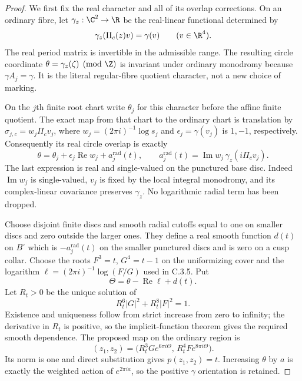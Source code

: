 \begin{proof}
We first fix the real character and all of its overlap corrections.
On an ordinary fibre, let
$\gamma_z:\C^2\to\R$ be the real-linear functional determined by
\[
 \gamma_z(\Pi_c(z)v)=\gamma(v)\qquad(v\in\R^4).
\]
The real period matrix is invertible in the admissible range.
The resulting circle coordinate
$\theta=\gamma_z(\zeta)\pmod\Z$ is invariant under ordinary
monodromy because $\gamma A_j=\gamma$. It is the literal
regular-fibre quotient character, not a new choice of marking.

On the $j$th finite root chart write $\theta_j$ for this
character before the affine finite quotient. The exact map from
that chart to the ordinary chart is translation by
$\sigma_{j,c}=w_j\Pi_cv_j$, where
$w_j=(2\pi i)^{-1}\log s_j$ and
$\epsilon_j=\gamma(v_j)$ is $1,-1$, respectively.
Consequently its real circle overlap is exactly
\begin{equation}\label{eq:C13-real-overlap}
 \theta=\theta_j+\epsilon_j\operatorname{Re}w_j+a_j^{\mathrm{rad}}(t),
 \qquad
 a_j^{\mathrm{rad}}(t)=\operatorname{Im}w_j\,
                  \gamma_z(i\Pi_cv_j).
\end{equation}
The last expression is real and single-valued on the punctured
base disc. Indeed $\operatorname{Im}w_j$ is single-valued,
$v_j$ is fixed by the local integral monodromy, and its
complex-linear covariance preserves $\gamma_z$.
No logarithmic radial term has been dropped.

Choose disjoint finite discs and smooth radial cutoffs equal to
one on smaller discs and zero outside the larger ones. They define
a real smooth function $d(t)$ on $B^\circ$ which is $-a_j^{\mathrm{rad}}(t)$
on the smaller punctured discs and is zero on a cusp collar.
Choose the roots $F^3=t$, $G^4=t-1$ on the uniformizing cover and
the logarithm $\ell=(2\pi i)^{-1}\log(F/G)$ used in C.3.5.
Put
\[
 \Theta=\theta-\operatorname{Re}\ell+d(t).
\]
Let $R_t>0$ be the unique solution of
\[
 R_t^6|G|^2+R_t^8|F|^2=1.
\]
Existence and uniqueness follow from strict increase from zero
to infinity; the derivative in $R_t$ is positive, so the
implicit-function theorem gives the required smooth dependence.
The proposed map on the ordinary region is
\begin{equation}\label{eq:C13-weighted-map}
 (z_1,z_2)=
 \bigl(R_t^3G e^{6\pi i\Theta},\,
                R_t^4F e^{8\pi i\Theta}\bigr).
\end{equation}
Its norm is one and direct substitution gives $p(z_1,z_2)=t$.
Increasing $\theta$ by $a$ is exactly the weighted action of
$e^{2\pi ia}$, so the positive $\gamma$ orientation is retained.


\end{proof}

